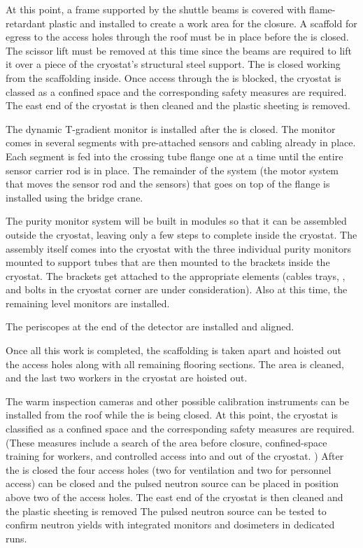 At this point, a frame supported by the shuttle beams is covered with flame-retardant plastic and installed to create a work area for the  closure.  
A scaffold  for egress to the access holes through the roof  must be in place before the  is closed. %
The scissor lift must be removed at this time since the  beams are required to lift it over a piece of the cryostat's structural steel support. 
The  is closed working from the scaffolding inside. 
Once access through the  is blocked, the cryostat is classed as a confined space and the corresponding safety measures are required.
The east end of the cryostat is then cleaned and the plastic sheeting is removed. 

The dynamic T-gradient monitor is installed after the  is closed. 
The monitor comes in several segments with pre-attached sensors and cabling already in place. Each segment is fed into the crossing tube flange one at a time until the entire sensor carrier rod is in place. 
The remainder of the system (the motor system that moves the sensor rod and the sensors) that goes on top of the flange is installed using the bridge crane. 

The purity monitor system will be built in modules so that it can be assembled outside the cryostat, leaving only a few steps to complete inside the cryostat. 
The assembly itself comes into the cryostat with the three individual purity monitors mounted to support tubes that are then mounted to the brackets inside the cryostat. The brackets get attached to the appropriate elements (cables trays, , and bolts in the cryostat corner are under consideration). Also at this time, the remaining level monitors are installed.

The periscopes at the end of the detector are installed and aligned. 

Once all this work is completed, the scaffolding is taken apart and hoisted out the access holes along with all remaining flooring sections. The area is cleaned, and the last two workers in the cryostat are hoisted out. 

The warm inspection cameras and other possible calibration instruments can be installed from the roof while the  is being closed. 
At this point, the cryostat is classified as a confined space and the corresponding safety measures are required. (These measures include a search of the area before closure, confined-space training for workers, and controlled access into and out of the cryostat. ) After the  is closed the four access holes (two for ventilation and two for personnel access)  can be closed and the pulsed neutron source can be placed in position above two of the access holes. The east end of the cryostat is then cleaned and the plastic sheeting is removed
The pulsed neutron source can be tested to confirm neutron yields with integrated monitors and dosimeters in dedicated runs.


